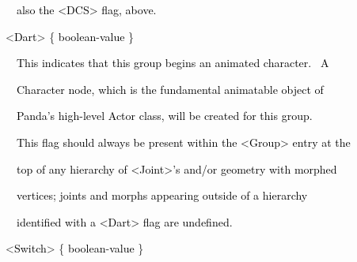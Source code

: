 \documentclass[a4paper]{article}
\newcommand\textstyleOOoComputerKeyWord[1]{\textrm{\textcolor[rgb]{0.0,0.0,0.5019608}{#1}}}
\newcommand\textstyleOOoAssemblerSpecialChar[1]{\textrm{\textcolor[rgb]{0.0,0.5019608,0.0}{#1}}}
\newcommand\textstyleOOoAssemblerIdent[1]{\textrm{\textcolor{black}{#1}}}
\begin{document}
{\color{black}
\textstyleOOoComputerKeyWord{\textcolor{black}{\ \ \ \ also the {\textless}DCS{\textgreater} flag, above.}}}


\bigskip


\bigskip

{\color{black}
\textstyleOOoComputerKeyWord{\textcolor{black}{\ \ }}\textstyleOOoAssemblerSpecialChar{{\textless}}\textstyleOOoAssemblerIdent{Dart}\textstyleOOoAssemblerSpecialChar{{\textgreater}}\textstyleOOoComputerKeyWord{\textcolor{black}{
}}\textstyleOOoAssemblerSpecialChar{\{}\textstyleOOoComputerKeyWord{\textcolor{black}{
}}\textstyleOOoAssemblerIdent{boolean}\textstyleOOoAssemblerSpecialChar{{}-}\textstyleOOoAssemblerIdent{value}\textstyleOOoComputerKeyWord{\textcolor{black}{
}}\textstyleOOoAssemblerSpecialChar{\}}}


\bigskip

{\color{black}
\textstyleOOoComputerKeyWord{\textcolor{black}{\ \ \ \ This indicates that this group begins an animated character.
\ A}}}

{\color{black}
\textstyleOOoComputerKeyWord{\textcolor{black}{\ \ \ \ Character node, which is the fundamental animatable object of}}}

{\color{black}
\textstyleOOoComputerKeyWord{\textcolor{black}{\ \ \ \ Panda's high-level Actor class, will be created for this
group.}}}


\bigskip

{\color{black}
\textstyleOOoComputerKeyWord{\textcolor{black}{\ \ \ \ This flag should always be present within the
{\textless}Group{\textgreater} entry at the}}}

{\color{black}
\textstyleOOoComputerKeyWord{\textcolor{black}{\ \ \ \ top of any hierarchy of {\textless}Joint{\textgreater}'s and/or
geometry with morphed}}}

{\color{black}
\textstyleOOoComputerKeyWord{\textcolor{black}{\ \ \ \ vertices; joints and morphs appearing outside of a hierarchy}}}

{\color{black}
\textstyleOOoComputerKeyWord{\textcolor{black}{\ \ \ \ identified with a {\textless}Dart{\textgreater} flag are
undefined.}}}


\bigskip

{\color{black}
\textstyleOOoComputerKeyWord{\textcolor{black}{\ \ }}\textstyleOOoAssemblerSpecialChar{{\textless}}\textstyleOOoAssemblerIdent{Switch}\textstyleOOoAssemblerSpecialChar{{\textgreater}}\textstyleOOoComputerKeyWord{\textcolor{black}{
}}\textstyleOOoAssemblerSpecialChar{\{}\textstyleOOoComputerKeyWord{\textcolor{black}{
}}\textstyleOOoAssemblerIdent{boolean}\textstyleOOoAssemblerSpecialChar{{}-}\textstyleOOoAssemblerIdent{value}\textstyleOOoComputerKeyWord{\textcolor{black}{
}}\textstyleOOoAssemblerSpecialChar{\}}}
\end{document}
